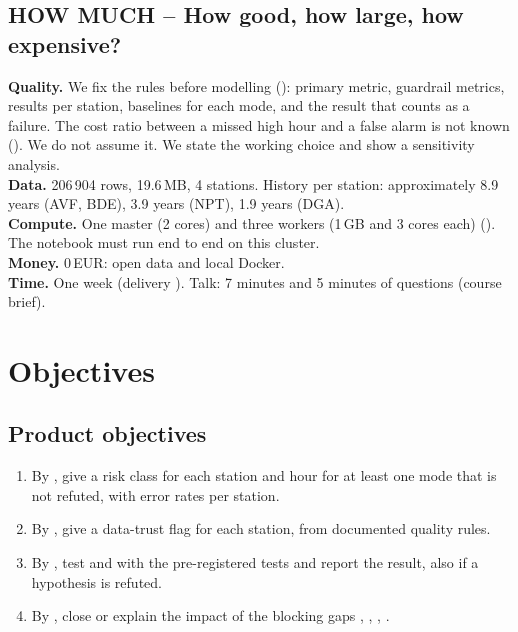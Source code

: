 \documentclass[11pt]{article}
\begin{document}
\subsection{HOW MUCH -- How good, how large, how expensive?}
\textbf{Quality.} We fix the rules before modelling (): primary metric, guardrail metrics, results per station, baselines for each mode, and the result that counts as a failure.
The cost ratio between a missed high hour and a false alarm is not known (). We do not assume it. We state the working choice and show a sensitivity analysis.\\
\textbf{Data.} \tObserved{} 206\,904 rows, 19.6\,MB, 4 stations. History per station: approximately 8.9 years (AVF, BDE), 3.9 years (NPT), 1.9 years (DGA).\\
\textbf{Compute.} One master (2 cores) and three workers (1\,GB and 3 cores each) \tSource{} (). The notebook must run end to end on this cluster.\\
\textbf{Money.} 0\,EUR: open data and local Docker.\\
\textbf{Time.} One week (delivery \deliverydate). Talk: 7 minutes and 5 minutes of questions \tSource{} (course brief).

\section{Objectives}
\subsection{Product objectives}
\begin{enumerate}
  \item By \deliverydate, give a risk class for each station and hour for at least one mode that is not refuted, with error rates per station.
  \item By \deliverydate, give a data-trust flag for each station, from documented quality rules.
  \item By \deliverydate, test  and  with the pre-registered tests and report the result, also if a hypothesis is refuted.
  \item By \deliverydate, close or explain the impact of the blocking gaps , , , .
\end{enumerate}
\end{document}
